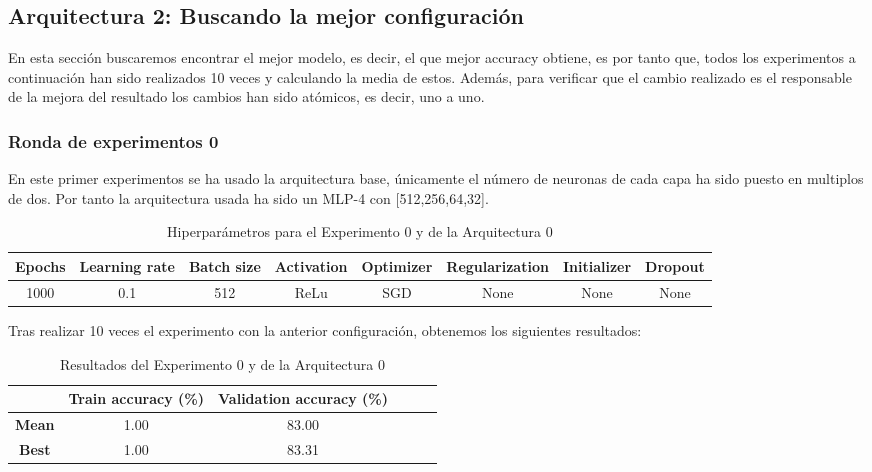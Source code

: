 \documentclass{article}
\begin{document}
   
		\subsection{Arquitectura 2: Buscando la mejor configuración}

 En esta sección buscaremos encontrar el mejor modelo, es decir, el que mejor accuracy obtiene, es por tanto que, todos los experimentos a continuación han sido realizados 10 veces y calculando la media de estos.
Además, para verificar que el cambio realizado es el responsable de la mejora del resultado los cambios han sido atómicos, es decir, uno a uno.

	\label{j-s-a0} %
		
		
		\subsubsection{Ronda de experimentos 0}
		\label{j-s-a0-e0} %
			En este primer experimentos se ha usado la arquitectura base, \'unicamente el n\'umero de neuronas de cada capa ha sido puesto en multiplos de dos. 
        Por tanto la arquitectura usada ha sido un MLP-4 con [512,256,64,32].
			
			\begin{table}[!h]
				\begin{center}
					\begin{tabular}{| c | c | c | c | c | c | c | c |}
						\textbf{Epochs} & \textbf{Learning rate} & \textbf{Batch size} & \textbf{Activation} & \textbf{Optimizer} & \textbf{Regularization} & \textbf{Initializer} & \textbf{Dropout}\\ \hline
						1000 & 0.1 & 512 & ReLu & SGD & None & None & None
					\end{tabular}
					\caption{Hiperpar\'ametros para el Experimento 0 y de la Arquitectura 0}
					\label{tab:hip-j-a0-e0}
				\end{center}
			\end{table}
			
			Tras realizar 10 veces el experimento con la anterior configuraci\'on, obtenemos los siguientes resultados:
			\begin{table}[!h]
				\begin{center}
					\begin{tabular}{ c | c | c | c | c | c |}
						\ & \textbf{Train accuracy (\%)} & \textbf{Validation accuracy (\%)}  \\ \hline
						\textbf{Mean} & 1.00 & 83.00 \\ \hline
						\textbf{Best} & 1.00 & 83.31 \\ \hline
					\end{tabular}
					\caption{Resultados del Experimento 0 y de la Arquitectura 0}
					\label{tab:res-j-a0-e0}
				\end{center}
			\end{table}
		    
\end{document}
